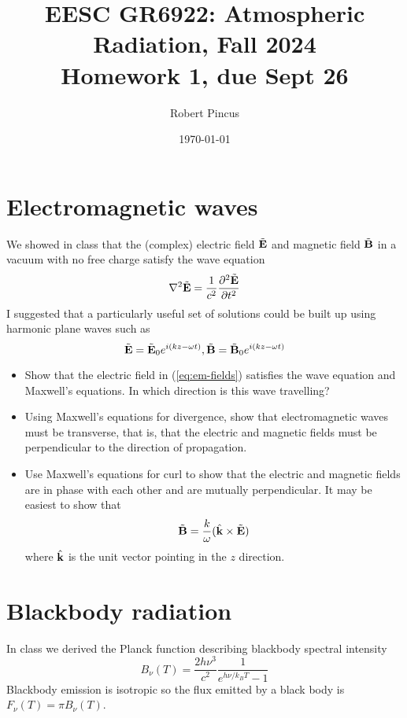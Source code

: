 \documentclass{article}
\title{EESC GR6922: Atmospheric Radiation, Fall 2024 \\ Homework 1, due Sept 26 }
\author{Robert Pincus}
\date{\today}
\begin{document}
\maketitle
\section{Electromagnetic waves}
We showed in class that the (complex) electric field $\tilde{\bf E}$ and magnetic field $\tilde{\bf B}$ in a vacuum with no free charge satisfy the wave equation
\begin{equation} \label{eq:wave-eq}
\nabla^2  \tilde{\bf E} = \frac{1}{c^2}\frac{\partial^2 \tilde{\bf E} }{\partial t^2}
\end{equation}
I suggested that a particularly useful set of solutions could be built up using harmonic plane waves such as
\begin{equation} \label{eq:em-fields} 
\tilde{\bf E} = \tilde{\bf E}_0 e^{i(k z - \omega t)}, \tilde{\bf B} = \tilde{\bf B}_0 e^{i(k z - \omega t)}
\end{equation} 

\begin{itemize} 
\item Show that the electric field in (\ref{eq:em-fields}) satisfies the wave equation and Maxwell's equations. In which direction is this wave travelling?
\item Using Maxwell’s equations for divergence, show that electromagnetic waves must be transverse, that is, that the electric and magnetic fields must be perpendicular to the direction of propagation.
\item Use Maxwell’s equations for curl to show that the electric and magnetic fields are in phase with each other and are mutually perpendicular. It may be easiest to show that
\begin{equation*}
\tilde{\bf B} =  \frac{k}{\omega} (\hat{\bf k} \times \tilde{\bf E})
\end{equation*}
where $\hat{\bf k}$ is the unit vector pointing in the $z$ direction. 
\end {itemize} 

\section{Blackbody radiation}

In class we derived the Planck function describing blackbody spectral intensity
\begin{equation}\label{eq:Planck-function}
 B_{\nu}(T) = \frac{2 h \nu^3}{c^2} \frac{1}{e^{h \nu/{k_B T}} - 1} 
\end{equation} 
Blackbody emission is isotropic so the flux emitted by a black body is $F_{\nu}(T) = \pi B_{\nu}(T)$.
\end{document}
